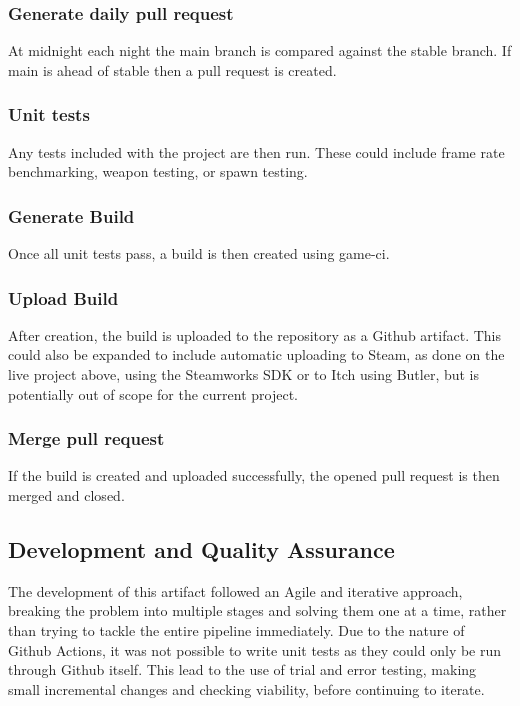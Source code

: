 \documentclass[journal]{IEEEtran}
\begin{document}
\subsubsection*{Generate daily pull request}
At midnight each night the main branch is compared against the stable branch. If main is ahead of stable then a pull request is created.\\

\subsubsection*{Unit tests}
Any tests included with the project are then run. These could include frame rate benchmarking, weapon testing, or spawn testing.\\

\subsubsection*{Generate Build}
Once all unit tests pass, a build is then created using game-ci\cite{gameci}. \\

\subsubsection*{Upload Build}
After creation, the build is uploaded to the repository as a Github artifact\cite{gitartifacts}. This could also be expanded to include automatic uploading to Steam, as done on the live project above, using the Steamworks SDK\cite{steamupload} or to Itch using Butler\cite{itchupload}, but is potentially out of scope for the current project.\\

\subsubsection*{Merge pull request}
If the build is created and uploaded successfully, the opened pull request is then merged and closed.

\subsection{Development and Quality Assurance}
The development of this artifact followed an Agile \cite{agilemanifesto} and iterative approach, breaking the problem into multiple stages and solving them one at a time, rather than trying to tackle the entire pipeline immediately. Due to the nature of Github Actions, it was not possible to write unit tests as they could only be run through Github itself. This lead to the use of trial and error testing, making small incremental changes and checking viability, before continuing to iterate. 
\end{document}
